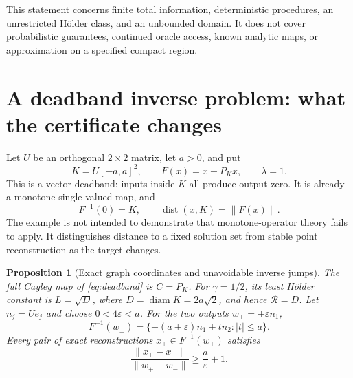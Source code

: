 \documentclass[11pt]{article}
\numberwithin{equation}{section}
\newtheorem{proposition}[theorem]{Proposition}
\theoremstyle{definition}
\theoremstyle{remark}
\newcommand{\dist}{\operatorname{dist}}
\newcommand{\diam}{\operatorname{diam}}
\newcommand{\rad}{\mathcal R}
\newcommand{\norm}[1]{\lVert #1\rVert}
\newcommand{\abs}[1]{\lvert #1\rvert}
\newcommand{\eps}{\varepsilon}
\begin{document}
This statement concerns finite total information, deterministic
procedures, an unrestricted H\"older class, and an unbounded domain.
It does not cover probabilistic guarantees, continued oracle access,
known analytic maps, or approximation on a specified compact region.

\section{A deadband inverse problem: what the certificate changes}
\label{sec:deadband}

Let $U$ be an orthogonal $2\times2$ matrix, let $a>0$, and put
\begin{equation}\label{eq:deadband}
 K=U[-a,a]^2,\qquad F(x)=x-P_Kx,\qquad \lambda=1.
\end{equation}
This is a vector deadband: inputs inside $K$ all produce output zero.
It is already a monotone single-valued map, and
\begin{equation}\label{eq:exactEB}
 F^{-1}(0)=K,\qquad \dist(x,K)=\norm{F(x)}.
\end{equation}
The example is not intended to demonstrate that monotone-operator
theory fails to apply. It distinguishes distance to a fixed solution
set from stable point reconstruction as the target changes.

\begin{proposition}[Exact graph coordinates and unavoidable inverse jumps]
\label{prop:deadbandjump}
The full Cayley map of \eqref{eq:deadband} is $C=P_K$. For
$\gamma=1/2$, its least H\"older constant is
$L=\sqrt D$, where $D=\diam K=2a\sqrt2$, and hence $\rad=D$.
Let $n_j=Ue_j$ and choose $0<4\eps<a$. For the two outputs
$w_\pm=\pm\eps n_1$,
\begin{equation}\label{eq:deadbandfibers}
 F^{-1}(w_\pm)=\{\pm(a+\eps)n_1+tn_2:\abs t\le a\}.
\end{equation}
Every pair of exact reconstructions $x_\pm\in F^{-1}(w_\pm)$ satisfies
\begin{equation}\label{eq:exactgain}
 \frac{\norm{x_+-x_-}}{\norm{w_+-w_-}}
 \ge\frac a\eps+1.
\end{equation}
\end{proposition}
\end{document}

